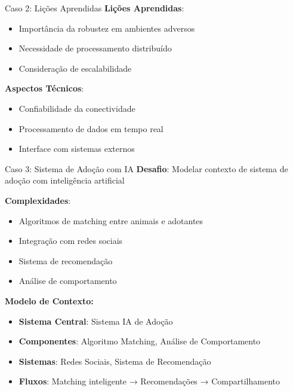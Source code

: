 \documentclass[aspectratio=169]{beamer}
\begin{document}
\begin{frame}{Caso 2: Lições Aprendidas}
\textbf{Lições Aprendidas}:
\begin{itemize}
\item Importância da robustez em ambientes adversos
\item Necessidade de processamento distribuído
\item Consideração de escalabilidade
\end{itemize}

\vspace{0.5cm}
\textbf{Aspectos Técnicos}:
\begin{itemize}
\item Confiabilidade da conectividade
\item Processamento de dados em tempo real
\item Interface com sistemas externos
\end{itemize}
\end{frame}

\begin{frame}{Caso 3: Sistema de Adoção com IA}
\textbf{Desafio}: Modelar contexto de sistema de adoção com inteligência artificial

\textbf{Complexidades}:
\begin{itemize}
\item Algoritmos de matching entre animais e adotantes
\item Integração com redes sociais
\item Sistema de recomendação
\item Análise de comportamento
\end{itemize}

\vspace{0.5cm}
\textbf{Modelo de Contexto:}
\begin{itemize}
\item \textbf{Sistema Central}: Sistema IA de Adoção
\item \textbf{Componentes}: Algoritmo Matching, Análise de Comportamento
\item \textbf{Sistemas}: Redes Sociais, Sistema de Recomendação
\item \textbf{Fluxos}: Matching inteligente → Recomendações → Compartilhamento
\end{itemize}
\end{frame}
\end{document}
